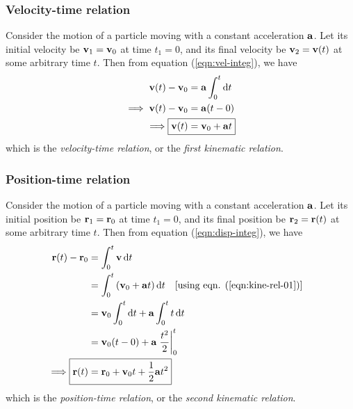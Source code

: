     	\subsubsection{Velocity-time relation}
    		Consider the motion of a particle moving with a constant acceleration $\vb{a}$. Let its initial velocity be $\vb{v}_1=\vb{v}_0$ at time $t_1=0$, and its final velocity be $\vb{v}_2=\vb{v}(t)$ at some arbitrary time $t$. Then from equation (\ref{eqn:vel-integ}), we have
    		\begin{align}
    			\vb{v}(t)-\vb{v}_0&=\vb{a}\int_{0}^{t}{\dd{t}} \nonumber\\
    			\implies\vb{v}(t)-\vb{v}_0&=\vb{a}\qty(t-0) \nonumber\\
    			\implies\Aboxed{\vb{v}(t)&=\vb{v}_0+\vb{a}t} \label{eqn:kine-rel-01}
    		\end{align}
    		which is the \emph{velocity-time relation}, or the \emph{first kinematic relation}.
    		
    	\subsubsection{Position-time relation}
    		Consider the motion of a particle moving with a constant acceleration $\vb{a}$. Let its initial position be $\vb{r}_1=\vb{r}_0$ at time $t_1=0$, and its final position be $\vb{r}_2=\vb{r}(t)$ at some arbitrary time $t$. Then from equation (\ref{eqn:disp-integ}), we have
    		\begin{align}
    			\vb{r}(t)-\vb{r}_0&=\int_{0}^{t}{\vb{v}\dd{t}} \nonumber\\
    				&=\int_{0}^{t}{\qty(\vb{v}_0+\vb{a}t)\dd{t}}\qq{[using eqn. (\ref{eqn:kine-rel-01})]} \nonumber\\
    				&=\vb{v}_0\int_{0}^{t}{\dd{t}}+\vb{a}\int_{0}^{t}{t\dd{t}} \nonumber\\
    				&=\vb{v}_0\qty(t-0)+\vb{a}\left. \dfrac{t^2}{2} \right|_{0}^{t} \nonumber\\
    			\implies\Aboxed{\vb{r}(t)&=\vb{r}_0+\vb{v}_0t+\dfrac{1}{2}\vb{a}t^2} \label{eqn:kine-rel-02}
    		\end{align}
    		which is the \emph{position-time relation}, or the \emph{second kinematic relation}.
    		
